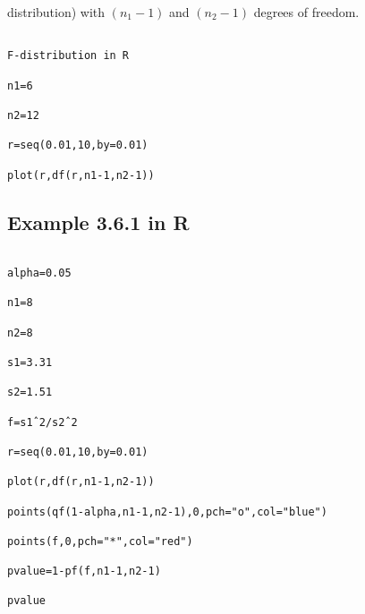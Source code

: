 distribution) with $(n_1-1)$ and $(n_2-1)$ degrees of freedom.



 

\begin{verbatim}

F-distribution in R

n1=6

n2=12

r=seq(0.01,10,by=0.01)

plot(r,df(r,n1-1,n2-1))

\end{verbatim}

 



 





 





\subsection{Example 3.6.1 in R}

\begin{verbatim}

alpha=0.05

n1=8

n2=8

s1=3.31

s2=1.51

f=s1ˆ2/s2ˆ2

r=seq(0.01,10,by=0.01)

plot(r,df(r,n1-1,n2-1))

points(qf(1-alpha,n1-1,n2-1),0,pch="o",col="blue")

points(f,0,pch="*",col="red")

pvalue=1-pf(f,n1-1,n2-1)

pvalue

\end{verbatim}

 



